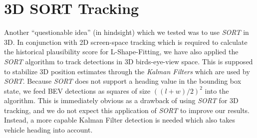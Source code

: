 \section{3D SORT Tracking}
\label{sec:trackthreed}

Another \enquote{questionable idea} (in hindsight) which we tested was to use \textit{SORT} in 3D.
In conjunction with 2D screen-space tracking which is required to calculate the historical plausibility score for L-Shape-Fitting, we have also applied the \textit{SORT} algorithm to track detections in 3D birds-eye-view space.
This is supposed to stabilize 3D position estimates through the \textit{Kalman Filters} which are used by \textit{SORT}.
Because \textit{SORT} does not support a heading value in the bounding box state, we feed BEV detections as squares of size $((l+w)/2)^2$ into the algorithm.
This is immediately obvious as a drawback of using \textit{SORT} for 3D tracking, and we do not expect this application of \textit{SORT} to improve our results.
Instead, a more capable Kalman Filter detection is needed which also takes vehicle heading into account.
